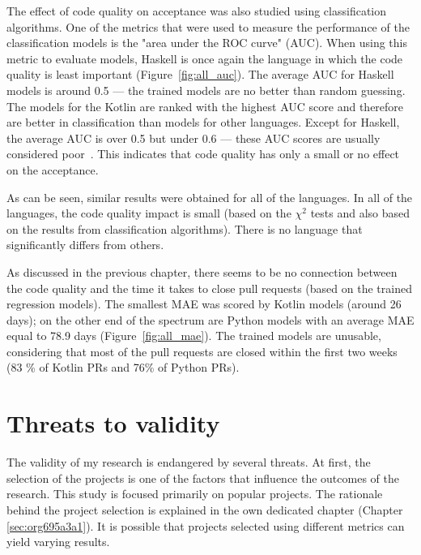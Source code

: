 \documentclass[digital,oneside,oldtable,nolof,nolot,nocover]{fithesis4}
\begin{document}
The effect of code quality on acceptance was also studied using
classification algorithms.  One of the metrics that were used to measure the
performance of the classification models is the "area under the ROC curve"
(AUC). When using this metric to evaluate models, Haskell is once again
the language in which the code quality is least important
(Figure~\ref{fig:all_auc}). The average AUC for Haskell models is around
0.5 --- the trained models are no better than random guessing.
The models for the Kotlin are ranked with the highest AUC score and therefore
are better in classification than models for other languages.
Except for Haskell, the average AUC is over 0.5 but under 0.6 --- these AUC
scores are usually considered poor~\cite{logreg}. This indicates that code quality
has only a small or no effect on the acceptance.

As can be seen, similar results were obtained for all of the languages.
In all of the languages, the code quality impact is small (based on the \(\chi^2\) tests
and also based on the results from classification algorithms). There is no language
that significantly differs from others.

As discussed in the previous chapter, there seems to be no connection between
the code quality and the time it takes to close pull requests (based on the
trained regression models). The smallest MAE was scored by Kotlin models
(around 26 days); on the other end of the spectrum are Python models with an
average MAE equal to 78.9 days (Figure~\ref{fig:all_mae}). The trained models are unusable, considering
that most of the pull requests are closed within the first two weeks (83 \% of Kotlin
PRs and 76\% of Python PRs).
\FloatBarrier
\section{Threats to validity}
\label{sec:org8b32069}
The validity of my research is endangered by several threats.
At first, the selection of the projects is one of the factors that influence
the outcomes of the research. This study is focused primarily on popular
projects. The rationale behind the project selection is explained in the own dedicated
chapter (Chapter \ref{sec:org695a3a1}). It is possible that projects selected using different metrics can yield
varying results.
\end{document}
